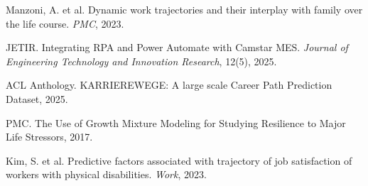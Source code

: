 \documentclass[main.tex]{subfiles}
\begin{document}
\begin{thebibliography}{20}
Manzoni, A. et al. Dynamic work trajectories and their interplay with family over the life course. \textit{PMC}, 2023.

JETIR. Integrating RPA and Power Automate with Camstar MES. \textit{Journal of Engineering Technology and Innovation Research}, 12(5), 2025.

ACL Anthology. KARRIEREWEGE: A large scale Career Path Prediction Dataset, 2025.

PMC. The Use of Growth Mixture Modeling for Studying Resilience to Major Life Stressors, 2017.

Kim, S. et al. Predictive factors associated with trajectory of job satisfaction of workers with physical disabilities. \textit{Work}, 2023.

\end{thebibliography}
\end{document}
